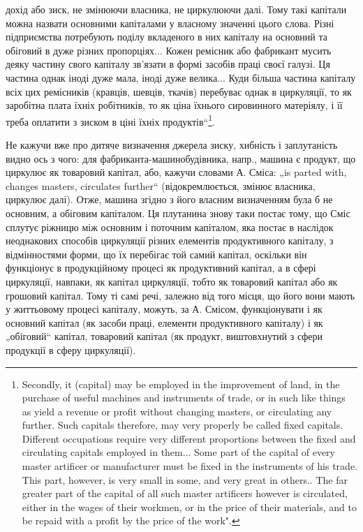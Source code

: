 \parcont{}  %
дохід або зиск, не змінюючи власника, не циркулюючи далі. Тому такі
капітали можна назвати основними капіталами у власному значенні цього
слова. Різні підприємства потребують поділу вкладеного в них капіталу
на основний та обіговий в дуже різних пропорціях... Кожен ремісник
або фабрикант мусить деяку частину свого капіталу зв’язати в формі
засобів праці своєї галузі. Ця частина однак іноді дуже мала, іноді дуже
велика... Куди більша частина капіталу всіх цих ремісників (кравців, шевців,
ткачів) перебуває однак в циркуляції, то як заробітна плата їхніх
робітників, то як ціна їхнього сировинного матеріялу, і її треба оплатити
з зиском в ціні їхніх продуктів“\footnote*{
Secondly, it (capital) may be employed in the improvement of land, in the
purchase of useful machines and instruments of trade, or in such like things as
yield a revenue or profit without changing masters, or circulating any further. Such
capitals therefore, may very properly be called fixed capitals. Different occupations
require very different proportions between the fixed and circulating capitals employed
in them... Some part of the capital of every master artificer or manufacturer
must be fixed in the instruments of his trade. This part, however, is very small in
some, and very great in others.. The far greater part of the capital of all such master
artificers however is circulated, either in the wages of their workmen, or in the
price of their materials, and to be repaid with a profit by the price of the work".
}.

Не кажучи вже про дитяче визначення джерела зиску, хибність і заплутаність
видно ось з чого: для фабриканта-машинобудівника, напр.,
машина є продукт, що циркулює як товаровий капітал, або, кажучи словами
А. Сміса: „is parted with, changes masters, circulates further“ (відокремлюється,
змінює власника, циркулює далі). Отже, машина згідно з
його власним визначенням була б не основним, а обіговим капіталом. Ця
плутанина знову таки постає тому, що Сміс сплутує ріжницю між основним
і поточним капіталом, яка постає в наслідок неоднакових способів
циркуляції різних елементів продуктивного капіталу, з відмінностями
форми, що їх перебігає той самий капітал, оскільки він функціонує
в продукційному процесі як продуктивний капітал, а в сфері
циркуляції, навпаки, як капітал циркуляції, тобто як товаровий капітал
або як грошовий капітал. Тому ті самі речі, залежно від того місця, що
його вони мають у життьовому процесі капіталу, можуть, за А. Смісом,
функціонувати і як основний капітал (як засоби праці, елементи продуктивного
капіталу) і як „обіговий“ капітал, товаровий капітал (як продукт,
виштовхнутий з сфери продукції в сферу циркуляції).

